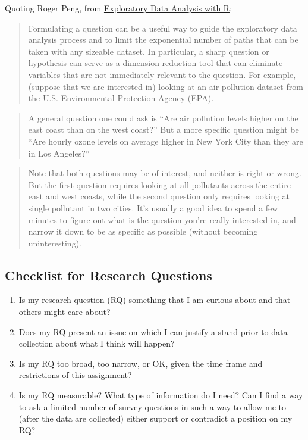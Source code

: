 \documentclass[]{book}
\providecommand{\tightlist}{%
  \setlength{\itemsep}{0pt}\setlength{\parskip}{0pt}}
\theoremstyle{definition}
\theoremstyle{definition}
\theoremstyle{definition}
\theoremstyle{remark}
\begin{document}
Quoting Roger Peng, from
\href{https://bookdown.org/rdpeng/exdata/}{Exploratory Data Analysis
with R}:

\begin{quote}
Formulating a question can be a useful way to guide the exploratory data
analysis process and to limit the exponential number of paths that can
be taken with any sizeable dataset. In particular, a sharp question or
hypothesis can serve as a dimension reduction tool that can eliminate
variables that are not immediately relevant to the question. For
example, (suppose that we are interested in) looking at an air pollution
dataset from the U.S. Environmental Protection Agency (EPA).
\end{quote}

\begin{quote}
A general question one could ask is ``Are air pollution levels higher on
the east coast than on the west coast?'' But a more specific question
might be ``Are hourly ozone levels on average higher in New York City
than they are in Los Angeles?''
\end{quote}

\begin{quote}
Note that both questions may be of interest, and neither is right or
wrong. But the first question requires looking at all pollutants across
the entire east and west coasts, while the second question only requires
looking at single pollutant in two cities. It's usually a good idea to
spend a few minutes to figure out what is the question you're really
interested in, and narrow it down to be as specific as possible (without
becoming uninteresting).
\end{quote}

\hypertarget{checklist-for-research-questions}{%
\subsection{Checklist for Research
Questions}\label{checklist-for-research-questions}}

\begin{enumerate}
\def\labelenumi{\arabic{enumi}.}
\tightlist
\item
  Is my research question (RQ) something that I am curious about and
  that others might care about?
\item
  Does my RQ present an issue on which I can justify a stand prior to
  data collection about what I think will happen?
\item
  Is my RQ too broad, too narrow, or OK, given the time frame and
  restrictions of this assignment?
\item
  Is my RQ measurable? What type of information do I need? Can I find a
  way to ask a limited number of survey questions in such a way to allow
  me to (after the data are collected) either support or contradict a
  position on my RQ?
\end{enumerate}
\end{document}
